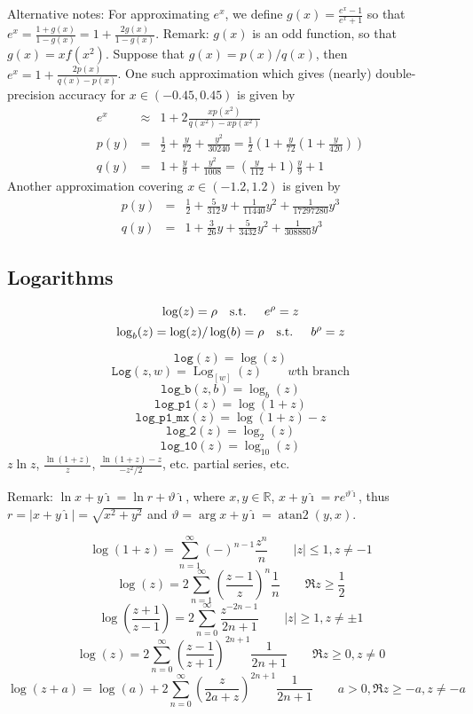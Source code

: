 \documentclass[10pt,dvipdfmx,letterpaper,twoside]{article}
\newcommand{\F}[1]{{\mathtt{#1}}}
\let\O=\operatorname
\newcommand{\RR}{{\mathbb{R}}}
\newcommand{\ii}{{\hat{\imath}}}
\let\theta=\vartheta
\begin{document}
Alternative notes:
For approximating $e^x$, we define $g(x)=\frac{e^x-1}{e^x+1}$ so that $e^x=\frac{1+g(x)}{1-g(x)} = 1+\frac{2g(x)}{1-g(x)}$.
Remark: $g(x)$ is an odd function, so that $g(x)=x f(x^2)$.  Suppose that $g(x)=p(x)/q(x)$, then $e^x = 1+\frac{2p(x)}{q(x)-p(x)}$.
One such approximation which gives (nearly) double-precision accuracy for $x\in(-0.45,0.45)$ is given by
\begin{eqnarray*}
  e^x &\approx& 1+2\frac{x p(x^2)}{q(x^2) - xp(x^2)} \\
  p(y) &=& \frac{1}{2} + \frac{y}{72} + \frac{y^2}{30240} = \frac{1}{2}\left(1+\frac{y}{72}\left(1+\frac{y}{420}\right)\right) \\
  q(y) &=& 1+\frac{y}{9}+\frac{y^2}{1008} = \left(\frac{y}{112}+1\right)\frac{y}{9} + 1
\end{eqnarray*}
Another approximation covering $x\in(-1.2,1.2)$ is given by
\begin{eqnarray*}
  p(y) &=& \frac{1}{2} + \frac{5}{312}y + \frac{1}{11440}y^2 + \frac{1}{17297280}y^3 \\
  q(y) &=& 1 + \frac{3}{26}y + \frac{5}{3432}y^2 + \frac{1}{308880}y^3
\end{eqnarray*}



\subsection{Logarithms}

\[ \log(z) = \rho \text{\quad s.t. \quad} e^\rho = z \]
\[ \log_b(z) = \log(z)/\log(b) = \rho \text{\quad s.t. \quad} b^\rho = z \]

\[ \F{log}(z) = \log(z) \]
\[ \F{Log}(z,w) = \O{Log}_{[w]}(z) \qquad\text{$w$th branch}\]
\[ \F{log\_b}(z, b) = \log_{b}(z) \]
\[ \F{log\_p1}(z) = \log(1+z) \]
\[ \F{log\_p1\_mx}(z) = \log(1+z)-z \]
\[ \F{log\_2}(z) = \log_{2}(z) \]
\[ \F{log\_10}(z) = \log_{10}(z) \]
$z\ln z$, $\frac{\ln(1+z)}{z}$, $\frac{\ln(1+z)-z}{-z^2/2}$, etc.
partial series, etc.

Remark: $\ln x+y\ii = \ln r + \theta\ii$, where $x,y\in\RR$, $x+y\ii=r e^{\theta\ii}$, thus
$r=|x+y\ii|=\sqrt{x^2+y^2}$ and $\theta=\arg x+y\ii = \O{atan2}(y,x)$.

\[ \log(1+z) = \sum_{n=1}^\infty (-)^{n-1} \frac{z^n}{n} \qquad |z|\leq1, z\neq-1 \]
\[ \log(z) = 2\sum_{n=1}^\infty\left(\frac{z-1}{z}\right)^n\frac{1}{n} \qquad \Re z\geq\frac12 \]
\[ \log(\frac{z+1}{z-1}) = 2\sum_{n=0}^\infty\frac{z^{-2n-1}}{2n+1} \qquad |z|\geq1, z\neq\pm1 \]
\[ \log(z) = 2\sum_{n=0}^\infty\left(\frac{z-1}{z+1}\right)^{2n+1} \frac{1}{2n+1} \qquad \Re z\geq0, z\neq0 \]
\[ \log(z+a) = \log(a) + 2\sum_{n=0}^\infty \left(\frac{z}{2a+z}\right)^{2n+1} \frac{1}{2n+1} \qquad a>0, \Re z\geq-a, z\neq-a \]
\end{document}
